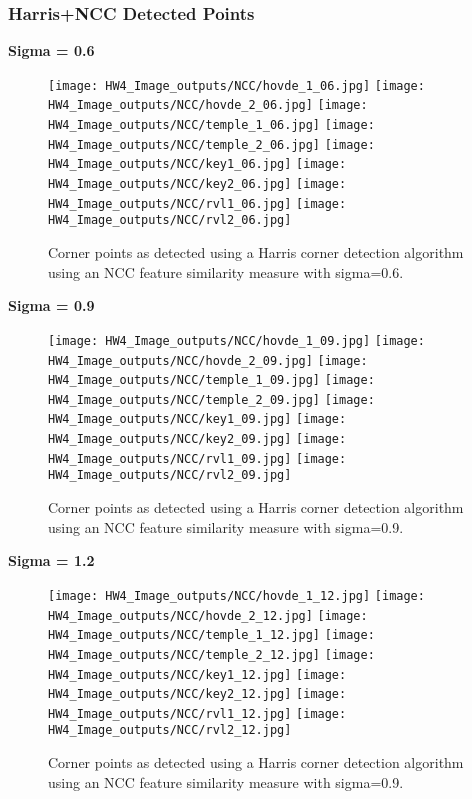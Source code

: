 \documentclass{article}
\begin{document}
\subsubsection{Harris+NCC Detected Points}
\newpage
\textbf{Sigma = 0.6}
\begin{figure}[H]
    \centering
    \texttt{[image: HW4\_Image\_outputs/NCC/hovde\_1\_06.jpg]}
    \texttt{[image: HW4\_Image\_outputs/NCC/hovde\_2\_06.jpg]}
    \texttt{[image: HW4\_Image\_outputs/NCC/temple\_1\_06.jpg]}
    \texttt{[image: HW4\_Image\_outputs/NCC/temple\_2\_06.jpg]}
    \texttt{[image: HW4\_Image\_outputs/NCC/key1\_06.jpg]}
    \texttt{[image: HW4\_Image\_outputs/NCC/key2\_06.jpg]}
    \texttt{[image: HW4\_Image\_outputs/NCC/rvl1\_06.jpg]}
    \texttt{[image: HW4\_Image\_outputs/NCC/rvl2\_06.jpg]}
    \caption{Corner points as detected using a Harris corner detection algorithm using an NCC feature similarity measure with sigma=0.6.}
    \label{fig:ncc-points-0.6}    
\end{figure}

\newpage
\textbf{Sigma = 0.9}
\begin{figure}[H]
    \centering
    \texttt{[image: HW4\_Image\_outputs/NCC/hovde\_1\_09.jpg]}
    \texttt{[image: HW4\_Image\_outputs/NCC/hovde\_2\_09.jpg]}
    \texttt{[image: HW4\_Image\_outputs/NCC/temple\_1\_09.jpg]}
    \texttt{[image: HW4\_Image\_outputs/NCC/temple\_2\_09.jpg]}
    \texttt{[image: HW4\_Image\_outputs/NCC/key1\_09.jpg]}
    \texttt{[image: HW4\_Image\_outputs/NCC/key2\_09.jpg]}
    \texttt{[image: HW4\_Image\_outputs/NCC/rvl1\_09.jpg]}
    \texttt{[image: HW4\_Image\_outputs/NCC/rvl2\_09.jpg]}
    \caption{Corner points as detected using a Harris corner detection algorithm using an NCC feature similarity measure with sigma=0.9.}
    \label{fig:ncc-points-0.6}
\end{figure}

\newpage
\textbf{Sigma = 1.2}
\begin{figure}[H]
    \centering
    \texttt{[image: HW4\_Image\_outputs/NCC/hovde\_1\_12.jpg]}
    \texttt{[image: HW4\_Image\_outputs/NCC/hovde\_2\_12.jpg]}
    \texttt{[image: HW4\_Image\_outputs/NCC/temple\_1\_12.jpg]}
    \texttt{[image: HW4\_Image\_outputs/NCC/temple\_2\_12.jpg]}
    \texttt{[image: HW4\_Image\_outputs/NCC/key1\_12.jpg]}
    \texttt{[image: HW4\_Image\_outputs/NCC/key2\_12.jpg]}
    \texttt{[image: HW4\_Image\_outputs/NCC/rvl1\_12.jpg]}
    \texttt{[image: HW4\_Image\_outputs/NCC/rvl2\_12.jpg]}
    \caption{Corner points as detected using a Harris corner detection algorithm using an NCC feature similarity measure with sigma=0.9.}
    \label{fig:ncc-points-0.9}
\end{figure}
\end{document}
